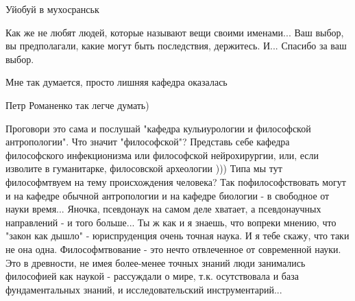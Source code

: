 \begin{itemize}
 
Уйобуй в мухосранськ

 
Как же не любят людей, которые называют вещи своими именами... Ваш выбор, вы предполагали, какие могут быть последствия, держитесь. И... Спасибо за ваш выбор.

\begin{itemize}
 
Мне так думается, просто лишняя кафедра оказалась

 
Петр Романенко так легче думать)

 

Проговори это сама и послушай "кафедра кульиурологии и философской
антропологии". Что значит "философской"? Представь себе кафедра философского
инфекционизма или философской нейрохирургии, или, если изволите в гуманитарке,
филосовской археологии ))) Типа мы тут философмтвуем на тему происхождения
человека? Так пофилософствовать могут и на кафедре обычной антропологии и на
кафедре биологии - в свободное от науки время... Яночка, псевдонаук на самом
деле хватает, а псевдонаучных направлений - и того больше... Ты ж как и я
знаешь, что вопреки мнению, что "закон как дышло" - юриспруденция очень точная
наука. И я тебе скажу, что таки не она одна. Философмтвование - это нечто
отвлеченное от современной науки. Это в древности, не имея более-менее точных
знаний люди занимались философией как наукой - рассуждали о мире, т.к.
осутствовала и база фундаментальных знаний, и исследовательский
инструментарий...



\end{itemize}
\end{itemize}

